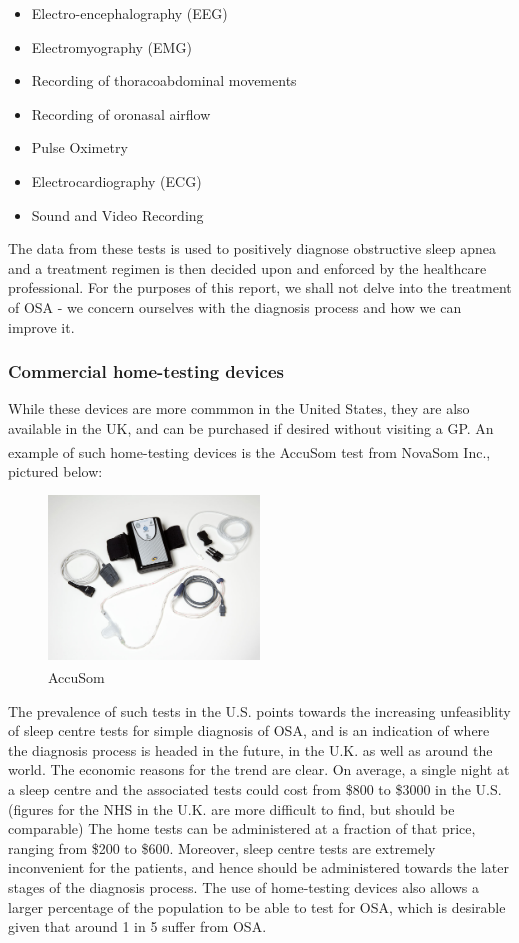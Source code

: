 	\begin{itemize}
	\item Electro-encephalography (EEG)
	\item Electromyography (EMG)
	\item Recording of thoracoabdominal movements
	\item Recording of oronasal airflow
	\item Pulse Oximetry
	\item Electrocardiography (ECG)
	\item Sound and Video Recording
	\end{itemize}

The data from these tests is used to positively diagnose obstructive sleep apnea and a treatment regimen is then decided upon and enforced by the healthcare professional. For the purposes of this report, we shall not delve into the treatment of OSA - we concern ourselves with the diagnosis process and how we can improve it.


\subsubsection{Commercial home-testing devices}

While these devices are more commmon in the United States, they are also available in the UK, and can be purchased if desired without visiting a GP. An example of such home-testing devices is the AccuSom\textsuperscript{\textregistered{}} test from NovaSom Inc., pictured below: 

\begin{figure}[!ht]
\centering
\includegraphics[width=0.5\textwidth]{drawings/Novasom}
\caption{AccuSom\textsuperscript{\textregistered{}}}
\label{fig:Novacom}
\end{figure}

The prevalence of such tests in the U.S. points towards the increasing
unfeasiblity of sleep centre tests for simple diagnosis of OSA, and
is an indication of where the diagnosis process is headed in the future,
in the U.K. as well as around the world. The economic reasons for
the trend are clear. On average, a single night at a sleep centre
and the associated tests could cost from \$800 to \$3000 in the U.S.
(figures for the NHS in the U.K. are more difficult to find, but should
be comparable) The home tests can be administered at a fraction of
that price, ranging from \$200 to \$600. Moreover, sleep centre tests
are extremely inconvenient for the patients, and hence should be administered
towards the later stages of the diagnosis process. The use of home-testing
devices also allows a larger percentage of the population to be able
to test for OSA, which is desirable given that around 1 in 5 suffer
from OSA.



